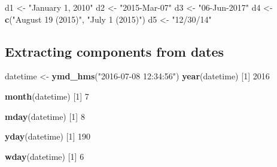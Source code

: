 \documentclass[
]{book}
\newenvironment{Shaded}{\begin{snugshade}}{\end{snugshade}}
\newcommand{\DecValTok}[1]{\textcolor[rgb]{0.00,0.00,0.81}{#1}}
\newcommand{\KeywordTok}[1]{\textcolor[rgb]{0.13,0.29,0.53}{\textbf{#1}}}
\newcommand{\NormalTok}[1]{#1}
\newcommand{\StringTok}[1]{\textcolor[rgb]{0.31,0.60,0.02}{#1}}
\begin{document}
\begin{Shaded}
\begin{Highlighting}[]
\NormalTok{d1 <-}\StringTok{ "January 1, 2010"}
\NormalTok{d2 <-}\StringTok{ "2015-Mar-07"}
\NormalTok{d3 <-}\StringTok{ "06-Jun-2017"}
\NormalTok{d4 <-}\StringTok{ }\KeywordTok{c}\NormalTok{(}\StringTok{"August 19 (2015)"}\NormalTok{, }\StringTok{"July 1 (2015)"}\NormalTok{)}
\NormalTok{d5 <-}\StringTok{ "12/30/14"}
\end{Highlighting}
\end{Shaded}

\hypertarget{extracting-components-from-dates}{%
\subsection*{Extracting components from dates}\label{extracting-components-from-dates}}

\begin{Shaded}
\begin{Highlighting}[]
\NormalTok{datetime <-}\StringTok{ }\KeywordTok{ymd_hms}\NormalTok{(}\StringTok{"2016-07-08 12:34:56"}\NormalTok{)}
\KeywordTok{year}\NormalTok{(datetime)}
\NormalTok{[}\DecValTok{1}\NormalTok{] }\DecValTok{2016}
\end{Highlighting}
\end{Shaded}

\begin{Shaded}
\begin{Highlighting}[]
\KeywordTok{month}\NormalTok{(datetime)}
\NormalTok{[}\DecValTok{1}\NormalTok{] }\DecValTok{7}
\end{Highlighting}
\end{Shaded}

\begin{Shaded}
\begin{Highlighting}[]
\KeywordTok{mday}\NormalTok{(datetime)}
\NormalTok{[}\DecValTok{1}\NormalTok{] }\DecValTok{8}
\end{Highlighting}
\end{Shaded}

\begin{Shaded}
\begin{Highlighting}[]
\KeywordTok{yday}\NormalTok{(datetime)}
\NormalTok{[}\DecValTok{1}\NormalTok{] }\DecValTok{190}
\end{Highlighting}
\end{Shaded}

\begin{Shaded}
\begin{Highlighting}[]
\KeywordTok{wday}\NormalTok{(datetime)}
\NormalTok{[}\DecValTok{1}\NormalTok{] }\DecValTok{6}
\end{Highlighting}
\end{Shaded}
\end{document}
